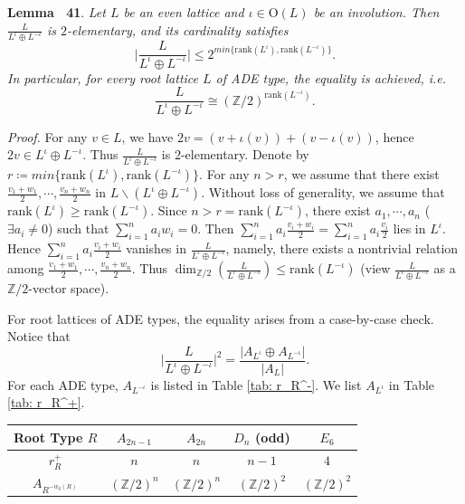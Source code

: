 \documentclass[
]{article}
\begin{document}
\textbf{Lemma~ 41}.
\emph{\label{lem: saturation induced by involution, inequality and ADE case}
Let \(L\) be an even lattice and \(\iota\in \mathrm{O}(L)\) be an
involution. Then \(\frac{L}{L^\iota \oplus L^{-\iota}}\) is
\(2\)-elementary, and its cardinality satisfies
\[\bigg|\frac{L}{L^\iota \oplus L^{-\iota}}\bigg| \le 2^{min\{\mathrm{rank} (L^\iota), \mathrm{rank} (L^{-\iota})\}}.\]
In particular, for every root lattice \(L\) of ADE type, the equality is
achieved, i.e.
\[\frac{L}{L^{\iota} \oplus L^{-\iota}} \cong (\mathbb{Z}/2)^{\mathrm{rank} (L^{-\iota})}.\]}

\emph{Proof.} For any \(v\in L\), we have
\(2v = (v+\iota(v))+(v-\iota(v))\), hence
\(2v\in L^{\iota} \oplus L^{-\iota}\). Thus
\(\frac{L}{L^\iota \oplus L^{-\iota}}\) is \(2\)-elementary. Denote by
\(r\coloneqq min\{\mathrm{rank} (L^\iota), \mathrm{rank} (L^{-\iota})\}\).
For any \(n>r\), we assume that there exist
\(\frac{v_1+w_1}{2},\cdots,\frac{v_n+w_n}{2}\) in
\(L\backslash(L^{\iota} \oplus L^{-\iota})\). Without loss of
generality, we assume that
\(\mathrm{rank} (L^\iota) \ge \mathrm{rank} (L^{-\iota})\). Since
\(n > r=\mathrm{rank} (L^{-\iota})\), there exist \(a_1,\cdots,a_n\)
(\(\exists a_i\neq 0\)) such that \(\sum\limits_{i=1}^n a_i w_i = 0\).
Then
\(\sum\limits_{i=1}^n a_i \frac{v_i+w_i}{2} = \sum\limits_{i=1}^n a_i \frac{v_i}{2}\)
lies in \(L^\iota\). Hence \(\sum\limits_{i=1}^n a_i \frac{v_i+w_i}{2}\)
vanishes in \(\frac{L}{L^{\iota} \oplus L^{-\iota}}\), namely, there
exists a nontrivial relation among
\(\frac{v_1+w_1}{2},\cdots,\frac{v_n+w_n}{2}\). Thus
\(\dim_{\mathbb{Z}/2}(\frac{L}{L^\iota \oplus L^{-\iota}}) \le \mathrm{rank} (L^{-\iota})\)
(view \(\frac{L}{L^\iota \oplus L^{-\iota}}\) as a
\(\mathbb{Z}/2\)-vector space).

For root lattices of ADE types, the equality arises from a case-by-case
check. Notice that
\[\bigg|\frac{L}{L^\iota \oplus L^{-\iota}}\bigg|^2 = \frac{|A_{L^\iota} \oplus A_{L^{-\iota}}|}{|A_L|}.\]
For each ADE type, \(A_{L^{-\iota}}\) is listed in Table
\ref{tab: r_R^-}. We list \(A_{L^\iota}\) in Table \ref{tab: r_R^+}.

\centering      

\begin{longtable}[]{@{}ccccc@{}}
\toprule\noalign{}
Root Type \(R\) & \(A_{2n-1}\) & \(A_{2n}\) & \(D_{n}\) (odd) &
\(E_6\) \\
\midrule\noalign{}
\endhead
\bottomrule\noalign{}
\endlastfoot
\(r_R^+\) & \(n\) & \(n\) & \(n-1\) & \(4\) \\
\(A_{R^{-w_0(R)}}\) & \((\mathbb{Z}/2)^{n}\) & \((\mathbb{Z}/2)^n\) &
\((\mathbb{Z}/2)^2\) & \((\mathbb{Z}/2)^2\) \\
\end{longtable}
\end{document}
